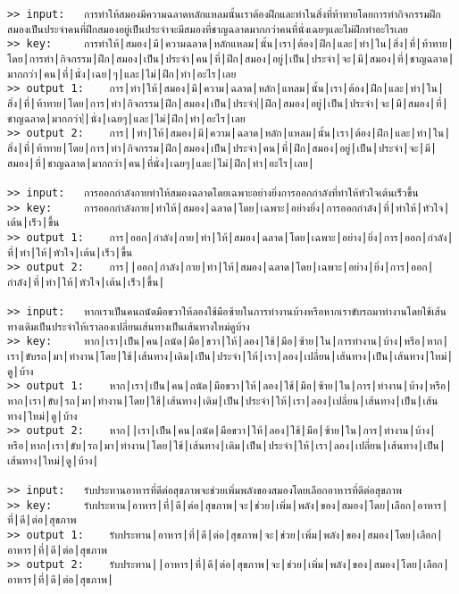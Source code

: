 \documentclass[11pt]{article}
\begin{document}
\begin{Verbatim}[commandchars=\\\{\}]
>> input:	การทำให้สมองมีความฉลาดหลักแหลมนั้นเราต้องฝึกและทำในสิ่งที่ท้าทายโดยการทำกิจกรรมฝึกสมองเป็นประจำคนที่ฝึกสมองอยู่เป็นประจำจะมีสมองที่ชาญฉลาดมากกว่าคนที่นั่งเฉยๆและไม่ฝึกทำอะไรเลย
>> key:		การทำให้|สมอง|มี|ความฉลาด|หลักแหลม|นั้น|เรา|ต้อง|ฝึก|และ|ทำ|ใน|สิ่ง|ที่|ท้าทาย|โดย|การทำ|กิจกรรม|ฝึก|สมอง|เป็น|ประจำ|คน|ที่|ฝึก|สมอง|อยู่|เป็น|ประจำ|จะ|มี|สมอง|ที่|ชาญฉลาด|มากกว่า|คน|ที่|นั่ง|เฉย|ๆ|และ|ไม่|ฝึก|ทำ|อะไร|เลย
>> output 1:	การ|ทำ|ให้|สมอง|มี|ความ|ฉลาด|หลัก|แหลม|นั้น|เรา|ต้อง|ฝึก|และ|ทำ|ใน|สิ่ง|ที่|ท้าทาย|โดย|การ|ทำ|กิจกรรม|ฝึก|สมอง|เป็น|ประจำ|่|ฝึก|สมอง|อยู่|เป็น|ประจำ|จะ|มี|สมอง|ที่|ชาญฉลาด|มากกว่า|่|นั่ง|เฉยๆ|และ|ไม่|ฝึก|ทำ|อะไร|เลย
>> output 2:	การ||ทำ|ให้|สมอง|มี|ความ|ฉลาด|หลัก|แหลม|นั้น|เรา|ต้อง|ฝึก|และ|ทำ|ใน|สิ่ง|ที่|ท้าทาย|โดย|การ|ทำ|กิจกรรม|ฝึก|สมอง|เป็น|ประจำ|คน|ที่|ฝึก|สมอง|อยู่|เป็น|ประจำ|จะ|มี|สมอง|ที่|ชาญฉลาด|มากกว่า|คน|ที่นั่ง|เฉยๆ|และ|ไม่|ฝึก|ทำ|อะไร|เลย|

>> input:	การออกกำลังกายทำให้สมองฉลาดโดยเฉพาะอย่างยิ่งการออกกำลังที่ทำให้หัวใจเต้นเร็วขึ้น
>> key:		การออกกำลังกาย|ทำให้|สมอง|ฉลาด|โดย|เฉพาะ|อย่างยิ่ง|การออกกำลัง|ที่|ทำให้|หัวใจ|เต้น|เร็ว|ขึ้น
>> output 1:	การ|ออก|กำลัง|กาย|ทำ|ให้|สมอง|ฉลาด|โดย|เฉพาะ|อย่าง|ยิ่ง|การ|ออก|กำลัง|ที่|ทำ|ให้|หัวใจ|เต้น|เร็ว|ขึ้น
>> output 2:	การ||ออก|กำลัง|กาย|ทำ|ให้|สมอง|ฉลาด|โดย|เฉพาะ|อย่าง|ยิ่ง|การ|ออก|กำลัง|ที่|ทำ|ให้|หัวใจ|เต้น|เร็ว|ขึ้น|

>> input:	หากเราเป็นคนถนัดมือขวาให้ลองใช้มือซ้ายในการทำงานบ้างหรือหากเราขับรถมาทำงานโดยใช้เส้นทางเดิมเป็นประจำให้เราลองเปลี่ยนเส้นทางเป็นเส้นทางใหม่ดูบ้าง
>> key:		หาก|เรา|เป็น|คน|ถนัด|มือ|ขวา|ให้|ลอง|ใช้|มือ|ซ้าย|ใน|การทำงาน|บ้าง|หรือ|หาก|เรา|ขับรถ|มา|ทำงาน|โดย|ใช้|เส้นทาง|เดิม|เป็น|ประจำ|ให้|เรา|ลอง|เปลี่ยน|เส้นทาง|เป็น|เส้นทาง|ใหม่|ดู|บ้าง
>> output 1:	หาก|เรา|เป็น|คน|ถนัด|มือขวา|ให้|ลอง|ใช้|มือ|ซ้าย|ใน|การ|ทำงาน|บ้าง|หรือ|หาก|เรา|ขับ|รถ|มา|ทำงาน|โดย|ใช้|เส้นทาง|เดิม|เป็น|ประจำ|ให้|เรา|ลอง|เปลี่ยน|เส้นทาง|เป็น|เส้นทาง|ใหม่|ดู|บ้าง
>> output 2:	หาก||เรา|เป็น|คน|ถนัด|มือขวา|ให้|ลอง|ใช้|มือ|ซ้าย|ใน|การ|ทำงาน|บ้าง|หรือ|หาก|เรา|ขับ|รถ|มา|ทำงาน|โดย|ใช้|เส้นทาง|เดิม|เป็น|ประจำ|ให้|เรา|ลอง|เปลี่ยน|เส้นทาง|เป็น|เส้นทาง|ใหม่|ดู|บ้าง|

>> input:	รับประทานอาหารที่ดีต่อสุขภาพจะช่วยเพิ่มพลังของสมองโดยเลือกอาหารที่ดีต่อสุขภาพ
>> key:		รับประทาน|อาหาร|ที่|ดี|ต่อ|สุขภาพ|จะ|ช่วย|เพิ่ม|พลัง|ของ|สมอง|โดย|เลือก|อาหาร|ที่|ดี|ต่อ|สุขภาพ
>> output 1:	รับประทาน|อาหาร|ที่|ดี|ต่อ|สุขภาพ|จะ|ช่วย|เพิ่ม|พลัง|ของ|สมอง|โดย|เลือก|อาหาร|ที่|ดี|ต่อ|สุขภาพ
>> output 2:	รับประทาน||อาหาร|ที่|ดี|ต่อ|สุขภาพ|จะ|ช่วย|เพิ่ม|พลัง|ของ|สมอง|โดย|เลือก|อาหาร|ที่|ดี|ต่อ|สุขภาพ|


\end{Verbatim}
\end{document}
